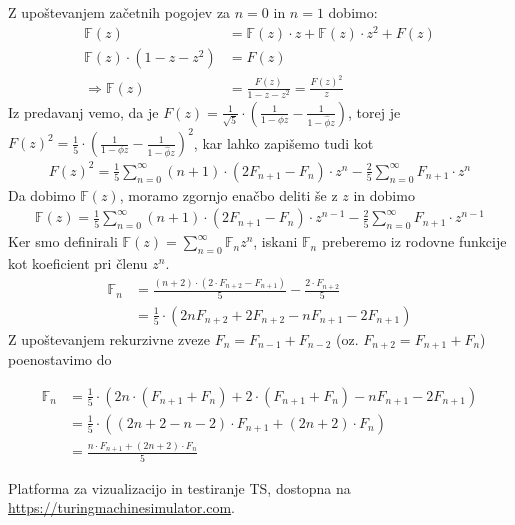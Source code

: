 \documentclass[a4paper,11pt]{article}
\begin{document}
Z upoštevanjem začetnih pogojev za $ n = 0$ in $n = 1$ dobimo:
\begin{align*}
\mathbb{F}(z) &= \mathbb{F}(z) \cdot z + \mathbb{F}(z) \cdot  z^2 + F(z)
\\
\mathbb{F}(z) \cdot \left(1 - z - z^2 \right) &= F(z)
\\
\Rightarrow 
\mathbb{F}(z) &= \frac{F(z)}{1 - z - z^2} = \frac{F(z)^2}{z}
\end{align*}
Iz predavanj vemo, da je $F(z) = \frac{1}{\sqrt{5}} \cdot \left( \frac{1}{1 - \phi z} - \frac{1}{1 - \hat{\phi}z}\right)$, torej je $F(z)^2 = \frac{1}{5} \cdot \left( \frac{1}{1 - \phi z} - \frac{1}{1 - \hat{\phi}z}\right)^2$, kar lahko zapišemo tudi kot
\begin{align*}
F(z)^2 = \frac{1}{5} \sum_{n = 0}^{\infty} (n + 1) \cdot \left( 2  F_{n + 1} - F_n \right) \cdot z^n - \frac{2}{5} \sum_{n = 0}^{\infty} F_{n + 1} \cdot z^n
\end{align*}
Da dobimo $\mathbb{F}(z)$, moramo zgornjo enačbo deliti še z $z$ in dobimo
\begin{align*}
    \mathbb{F}(z) = \frac{1}{5} \sum_{n = 0}^{\infty} (n + 1) \cdot \left( 2  F_{n + 1} - F_n \right) \cdot z^{n - 1} - \frac{2}{5} \sum_{n = 0}^{\infty} F_{n + 1} \cdot z^{n - 1}
\end{align*}
Ker smo definirali $\mathbb{F}(z) = \sum_{n = 0}^{\infty} \mathbb{F}_n z^n$, iskani $\mathbb{F}_n$ preberemo iz rodovne funkcije kot koeficient pri členu $z^n$.
\begin{align*}
    \mathbb{F}_n &= \frac{(n + 2) \cdot ( 2 \cdot F_{n + 2} - F_{n + 1})}{5} - \frac{2 \cdot F_{n + 2}}{5}
    \\
    &= \frac{1}{5} \cdot \left(  2n  F_{n + 2} + 2 F_{n + 2} - n F_{n + 1} - 2 F_{n + 1} \right)
\end{align*}
Z upoštevanjem rekurzivne zveze $F_n = F_{n - 1} + F_{n - 2}$ (oz. $F_{n + 2} = F_{n + 1} + F_n$) poenostavimo do

\begin{align*}
    \mathbb{F}_n &= \frac{1}{5} \cdot \left(  2n  \cdot (F_{n + 1} + F_n) + 2 \cdot (F_{n + 1} + F_n) - n F_{n + 1} - 2 F_{n + 1} \right)
    \\
    &= \frac{1}{5} \cdot \left( (2n + 2 - n - 2) \cdot F_{n + 1} + (2n + 2) \cdot F_n \right)
    \\
    &= \frac{n \cdot F_{n + 1} + (2n + 2) \cdot F_n}{5}
\end{align*}



\begin{thebibliography}{99}
    Platforma za vizualizacijo in testiranje TS, dostopna na \url{https://turingmachinesimulator.com}.
\end{thebibliography}
\end{document}
